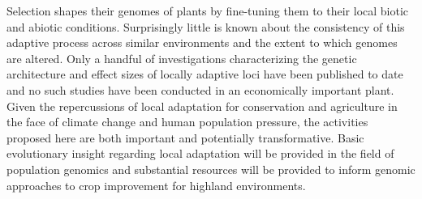 
%


Selection shapes their genomes of plants by fine-tuning them to their local biotic and abiotic conditions.  Surprisingly little is known about the consistency of this adaptive process across similar environments and the extent to which genomes are altered. Only a handful of investigations characterizing the genetic architecture and effect sizes of locally adaptive loci have been published to date and no such studies have been conducted in an economically important plant. Given the repercussions of local adaptation for conservation and agriculture in the face of climate change and human population pressure, the activities proposed here are both important and potentially transformative.  Basic evolutionary insight regarding local adaptation will be provided in the field of population genomics and substantial resources will be provided to inform genomic approaches to crop improvement for highland environments.



